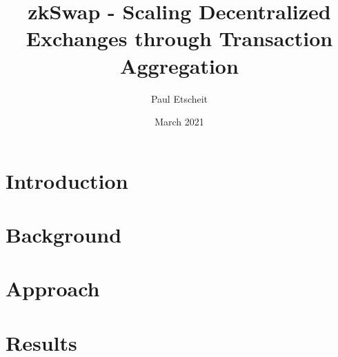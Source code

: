 \documentclass[11pt,twoside,a4paper,final]{book}
\title{zkSwap - Scaling Decentralized Exchanges through Transaction Aggregation}
\author{Paul Etscheit}
\date{March 2021}
\begin{document}
\begin{titlepage}
    \maketitle
\end{titlepage}

\tableofcontents
\section{Introduction}


\section{Background}


\section{Approach}


\section{Results}



\end{document}

